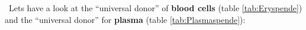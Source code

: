 %

\vspace{0.5cm} \enlargethispage{1.6cm}
\Pointinghand\, Lets have a look at the "`universal donor"' of \textbf{blood cells} (table \ref{tab:Eryspende}) and the "`universal donor"' for \textbf{plasma} (table \ref{tab:Plasmaspende}):

